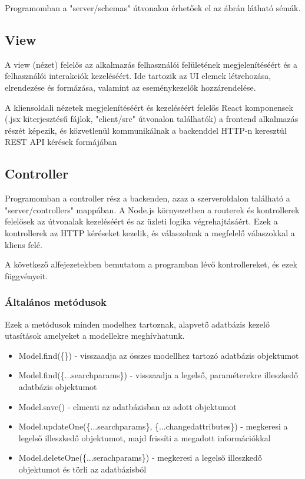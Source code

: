 Programomban a "server/schemas" útvonalon érhetőek el az ábrán látható sémák.

\subsection{View}

A view (nézet) felelős az alkalmazás felhasználói felületének megjelenítéséért és a felhasználói interakciók kezeléséért. Ide tartozik az UI elemek létrehozása, elrendezése és formázása, valamint az eseménykezelők hozzárendelése.

A kliensoldali nézetek megjelenítéséért és kezeléséért felelős React komponensek (.jsx kiterjesztésű fájlok, "client/src" útvonalon találhatók) a frontend alkalmazás részét képezik, és közvetlenül kommunikálnak a backenddel HTTP-n keresztül REST API kérések formájában

\subsection{Controller}

Programomban a controller rész a backenden, azaz a szerveroldalon található a "server/controllers" mappában. A Node.js környezetben a routerek és kontrollerek felelősek az útvonalak kezeléséért és az üzleti logika végrehajtásáért. Ezek a kontrollerek az HTTP kéréseket kezelik, és válaszolnak a megfelelő válaszokkal a kliens felé.

A következő alfejezetekben bemutatom a programban lévő kontrollereket, és ezek függvényeit. 

\subsubsection{Általános metódusok}

Ezek a metódusok minden modelhez tartoznak, alapvető adatbázis kezelő utasítások amelyeket a modellekre meghívhatunk.

\begin{itemize}
	\item Model.find(\{\}) - visszaadja az összes modellhez tartozó adatbázis objektumot
	\item Model.find(\{...searchparams\}) - visszaadja a legelső, paraméterekre illeszkedő adatbázis objektumot
	\item Model.save() - elmenti az adatbázisban az adott objektumot
	\item Model.updateOne(\{...searchparams\}, \{...changedattributes\}) - megkeresi a legelső illeszkedő objektumot, majd frissíti a megadott információkkal
	\item Model.deleteOne(\{...serachparams\}) - megkeresi a legelső illeszkedő objektumot és törli az adatbázisból
\end{itemize}

